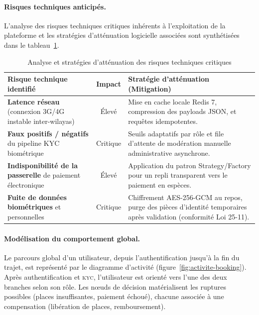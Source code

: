 \paragraph{Risques techniques anticipés.} L'analyse des risques techniques critiques inhérents à l'exploitation de la plateforme et les stratégies d'atténuation logicielle associées sont synthétisées dans le tableau~\ref{tab:risques-mitigations}.

\begin{table}[H]
\centering
\small
\renewcommand{\arraystretch}{1.3}
\begin{tabularx}{\textwidth}{|X|c|X|}
\hline
\rowcolor{rohlight}
\textbf{Risque technique identifié} & \textbf{Impact} & \textbf{Stratégie d'atténuation (Mitigation)} \\
\hline
\textbf{Latence réseau} (connexion 3G/4G instable inter-wilayas) & Élevé & Mise en cache locale Redis 7, compression des payloads JSON, et requêtes idempotentes. \\
\hline
\textbf{Faux positifs / négatifs} du pipeline KYC biométrique & Critique & Seuils adaptatifs par rôle et file d'attente de modération manuelle administrative asynchrone. \\
\hline
\textbf{Indisponibilité de la passerelle} de paiement électronique & Élevé & Application du patron Strategy/Factory pour un repli transparent vers le paiement en espèces. \\
\hline
\textbf{Fuite de données biométriques} et personnelles & Critique & Chiffrement AES-256-GCM au repos, purge des pièces d'identité temporaires après validation (conformité Loi 25-11). \\
\hline
\end{tabularx}
\caption{Analyse et stratégies d'atténuation des risques techniques critiques}
\label{tab:risques-mitigations}
\end{table}

\paragraph{Modélisation du comportement global.}

Le parcours global d'un utilisateur, depuis l'authentification jusqu'à la fin du trajet, est représenté par le diagramme d'activité (figure~\ref{fig:activite-booking}). Après authentification et \textsc{kyc}, l'utilisateur est orienté vers l'une des deux branches selon son rôle. Les nœuds de décision matérialisent les ruptures possibles (places insuffisantes, paiement échoué), chacune associée à une compensation (libération de places, remboursement).

